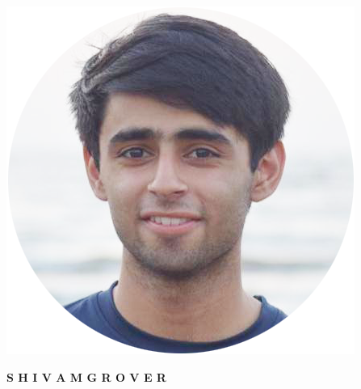 \documentclass[10pt]{article}
\begin{document}
\begin{mdframed}[backgroundcolor=theme]

\begin{minipage}{0.4\textwidth}
\begin{flushleft}
\vspace{1mm}

    \includegraphics[scale=0.35]{picture.png}
\vspace{0.5mm}

\end{flushleft}

\end{minipage}
\begin{minipage}{\textwidth}


\begin{minipage}{0.55\textwidth}

\color{white}\textbf{\Huge{S H I V A M  \hspace{2mm}  G R O V E R}}\raggedright


\vspace{3mm}
\vspace{5mm}

\end{minipage}




\end{minipage}
\end{mdframed}
\end{document}
